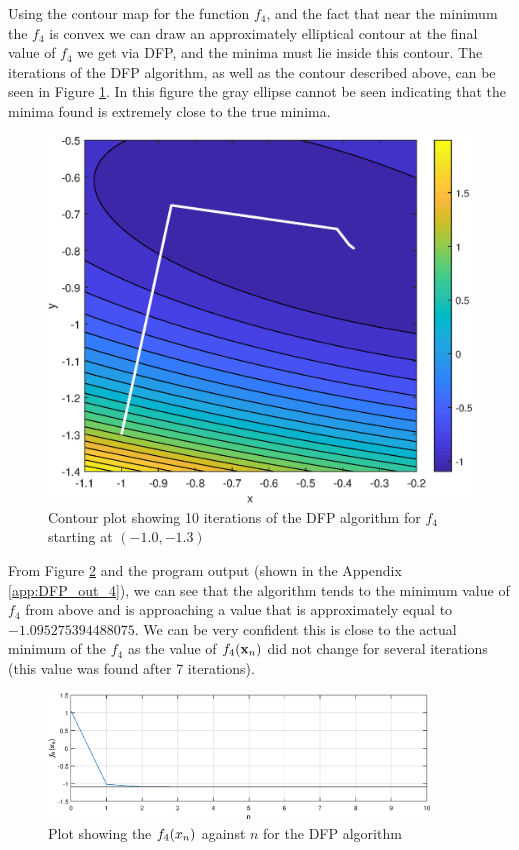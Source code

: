 \documentclass[11pt]{article} %
\let\originalleft\left
\let\originalright\right
\renewcommand{\left}{\mathopen{}\mathclose\bgroup\originalleft}
\renewcommand{\right}{\aftergroup\egroup\originalright}
\begin{document}
Using the contour map for the function $f_4$, and the fact that near the minimum the $f_4$ is convex we can draw an approximately elliptical contour at the final value of $f_4$ we get via DFP, and the minima must lie inside this contour. The iterations of the DFP algorithm, as well as the contour described above, can be seen in Figure \ref{fig:DFP_10_iter}. In this figure the gray ellipse cannot be seen indicating that the minima found is extremely close to the true minima.


\begin{figure}[!h]
	\centering
	\includegraphics{"../Matlab Files/contour7"}
	\caption{Contour plot showing 10 iterations of the DFP algorithm for $f_4$ starting at $(-1.0, -1.3)$}
	\label{fig:DFP_10_iter}
\end{figure}


From Figure \ref{fig:DFP_limit} and the program output (shown in the Appendix \ref{app:DFP_out_4}), we can see that the algorithm tends to the minimum value of $f_4$ from above and is approaching a value that is approximately equal to $-1.095275394488075$. We can be very confident this is close to the actual minimum of the $f_4$ as the value of $f_4\left(\mathbf{x}_n\right)$ did not change for several iterations (this value was found after 7 iterations).


\begin{figure}[!h]
	\centering
	\includegraphics[width=0.9\textwidth]{"../Matlab Files/flimit3"}
	\caption{Plot showing the $f_4\left(x_n\right)$ against $n$ for the DFP algorithm}
	\label{fig:DFP_limit}
\end{figure}
\end{document}
